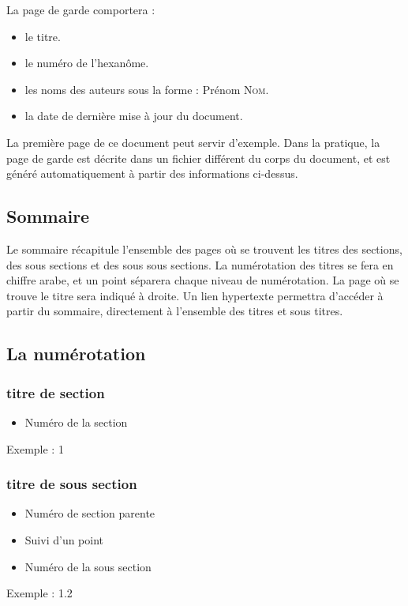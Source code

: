     La page de garde comportera :
    \begin{itemize}
      \item le titre.
      \item le numéro de l'hexanôme.
      \item les noms des auteurs sous la forme : Prénom \textsc{Nom}.
      \item la date de dernière mise à jour du document.
    \end{itemize}
    La première page de ce document peut servir d'exemple.
    Dans la pratique, la page de garde est décrite dans un fichier différent du corps du document, et est généré automatiquement à partir des informations ci-dessus.

\subsection{Sommaire}
  
   Le sommaire récapitule l'ensemble des pages où se trouvent les titres des sections, des sous sections et des sous sous sections.
   La numérotation des titres se fera en chiffre arabe, et un point séparera chaque niveau de numérotation.
   La page où se trouve le titre sera indiqué à droite.
   Un lien hypertexte permettra d'accéder à partir du sommaire, directement à l'ensemble des titres et sous titres.

\subsection{La numérotation}
   
   \subsubsection{titre de section}
   \begin{itemize}
        \item Numéro de la section
   \end{itemize}
        Exemple : 1

   \subsubsection{titre de sous section}
   \begin{itemize}
      \item Numéro de section parente
      \item Suivi d'un point
      \item Numéro de la sous section
   \end{itemize}
        Exemple : 1.2

